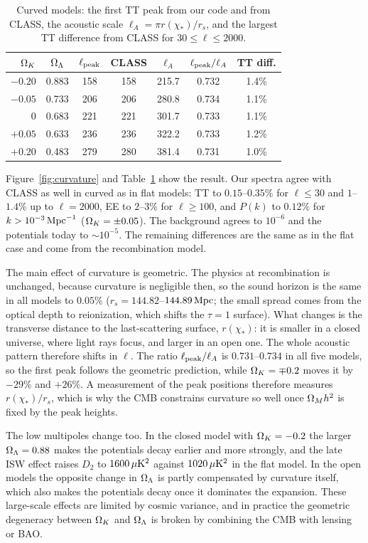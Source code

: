 \begin{table}
\caption{Curved models: the first TT peak from our code and from CLASS, the acoustic scale $\ell_A=\pi r(\chi_*)/r_s$,
and the largest TT difference from CLASS for $30\le\ell\le2000$.}
\label{tab:curvature}
\begin{ruledtabular}
\begin{tabular}{rcccccc}
$\Omega_K$ & $\Omega_\Lambda$ & $\ell_{\rm peak}$ & CLASS & $\ell_A$ & $\ell_{\rm peak}/\ell_A$ & TT diff. \\
\hline
$-0.20$ & 0.883 & 158 & 158 & 215.7 & 0.732 & 1.4\% \\
$-0.05$ & 0.733 & 206 & 206 & 280.8 & 0.734 & 1.1\% \\
$0$     & 0.683 & 221 & 221 & 301.7 & 0.733 & 1.1\% \\
$+0.05$ & 0.633 & 236 & 236 & 322.2 & 0.733 & 1.2\% \\
$+0.20$ & 0.483 & 279 & 280 & 381.4 & 0.731 & 1.0\% \\
\end{tabular}
\end{ruledtabular}
\end{table}

Figure~\ref{fig:curvature} and Table~\ref{tab:curvature} show the result. Our spectra agree with CLASS as well in
curved as in flat models: TT to $0.15$--$0.35\%$ for $\ell\le30$ and $1$--$1.4\%$ up to $\ell=2000$, EE to $2$--$3\%$ for
$\ell\ge100$, and $P(k)$ to $0.12\%$ for $k>10^{-3}\,\mathrm{Mpc}^{-1}$ ($\Omega_K=\pm0.05$). The background agrees to $10^{-6}$ and the potentials
today to $\sim10^{-5}$. The remaining differences are the same as in the flat case and come from the recombination
model.

The main effect of curvature is geometric. The physics at recombination is unchanged, because curvature is negligible
then, so the sound horizon is the same in all models to $0.05\%$ ($r_s=144.82$--$144.89\,\mathrm{Mpc}$; the small spread comes
from the optical depth to reionization, which shifts the $\tau=1$ surface). What changes is the transverse distance to the last-scattering surface, $r(\chi_*)$: it is
smaller in a closed universe, where light rays focus, and larger in an open one. The whole acoustic pattern therefore
shifts in $\ell$. The ratio $\ell_{\rm peak}/\ell_A$ is $0.731$--$0.734$ in all five models, so the first peak follows the
geometric prediction, while $\Omega_K=\mp0.2$ moves it by $-29\%$ and $+26\%$. A measurement of the peak positions
therefore measures $r(\chi_*)/r_s$, which is why the CMB constrains curvature so well once $\Omega_Mh^2$ is fixed by the
peak heights.

The low multipoles change too. In the closed model with $\Omega_K=-0.2$ the larger $\Omega_\Lambda=0.88$ makes the potentials
decay earlier and more strongly, and the late ISW effect raises $D_2$ to $1600\,\mu\mathrm{K}^2$ against $1020\,\mu\mathrm{K}^2$ in the flat
model. In the open models the opposite change in $\Omega_\Lambda$ is partly compensated by curvature itself, which also
makes the potentials decay once it dominates the expansion. These large-scale effects are limited by cosmic variance,
and in practice the geometric degeneracy between $\Omega_K$ and $\Omega_\Lambda$ is broken by combining the CMB with
lensing or BAO.
